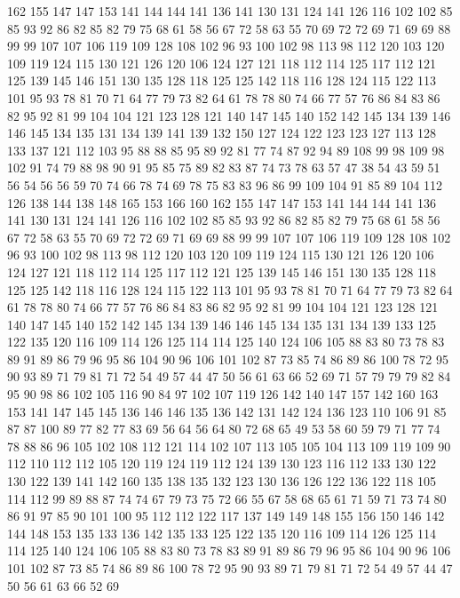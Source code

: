 162 155 147 147 153 141 144 144 141 136 141 130 131 124 141 126 116 102 102 85
85 93 92 86 82 85 82 79 75 68 61 58 56 67 72 58 63 55 70 69
72 72 69 71 69 69 88 99 99 107 107 106 119 109 128 108 102 96 93 100
102 98 113 98 112 120 103 120 109 119 124 115 130 121 126 120 106 124 127 121
118 112 114 125 117 112 121 125 139 145 146 151 130 135 128 118 125 125 142 118
116 128 124 115 122 113 101 95 93 78 81 70 71 64 77 79 73 82 64 61
78 78 80 74 66 77 57 76 86 84 83 86 82 95 92 81 99 104 104 121
123 128 121 140 147 145 140 152 142 145 134 139 146 146 145 134 135 131 134 139
141 139 132 150 127 124 122 123 123 127 113 128 133 137 121 112 103 95 88 88
85 95 89 92 81 77 74 87 92 94 89 108 99 98 109 98 102 91 74 79
88 98 90 91 95 85 75 89 82 83 87 74 73 78 63 57 47 38 54 43
59 51 56 54 56 56 59 70 74 66 78 74 69 78 75 83 83 96 86 99
109 104 91 85 89 104 112 126 138 144 138 148 165 153 166 160 162 155 147 147
153 141 144 144 141 136 141 130 131 124 141 126 116 102 102 85 85 93 92 86
82 85 82 79 75 68 61 58 56 67 72 58 63 55 70 69 72 72 69 71
69 69 88 99 99 107 107 106 119 109 128 108 102 96 93 100 102 98 113 98
112 120 103 120 109 119 124 115 130 121 126 120 106 124 127 121 118 112 114 125
117 112 121 125 139 145 146 151 130 135 128 118 125 125 142 118 116 128 124 115
122 113 101 95 93 78 81 70 71 64 77 79 73 82 64 61 78 78 80 74
66 77 57 76 86 84 83 86 82 95 92 81 99 104 104 121 123 128 121 140
147 145 140 152 142 145 134 139 146 146 145 134 135 131 134 139 133 125 122 135
120 116 109 114 126 125 114 114 125 140 124 106 105 88 83 80 73 78 83 89
91 89 86 79 96 95 86 104 90 96 106 101 102 87 73 85 74 86 89 86
100 78 72 95 90 93 89 71 79 81 71 72 54 49 57 44 47 50 56 61
63 66 52 69 71 57 79 79 79 82 84 95 90 98 86 102 105 116 90 84
97 102 107 119 126 142 140 147 157 142 160 163 153 141 147 145 145 136 146 146
135 136 142 131 142 124 136 123 110 106 91 85 87 87 100 89 77 82 77 83
69 56 64 56 64 80 72 68 65 49 53 58 60 59 79 71 77 74 78 88
86 96 105 102 108 112 121 114 102 107 113 105 105 104 113 109 119 109 90 112
110 112 112 105 120 119 124 119 112 124 139 130 123 116 112 133 130 122 130 122
139 141 142 160 135 138 135 132 123 130 136 126 122 136 122 118 105 114 112 99
89 88 87 74 74 67 79 73 75 72 66 55 67 58 68 65 61 71 59 71
73 74 80 86 91 97 85 90 101 100 95 112 112 122 117 137 149 149 148 155
156 150 146 142 144 148 153 135 133 136 142 135 133 125 122 135 120 116 109 114
126 125 114 114 125 140 124 106 105 88 83 80 73 78 83 89 91 89 86 79
96 95 86 104 90 96 106 101 102 87 73 85 74 86 89 86 100 78 72 95
90 93 89 71 79 81 71 72 54 49 57 44 47 50 56 61 63 66 52 69
